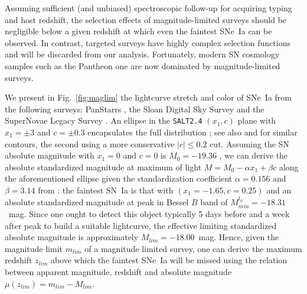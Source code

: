 \documentclass[]{aa} %
\begin{document}
Assuming sufficient (and unbiased) spectroscopic follow-up for acquiring typing
and host redshift, the selection effects of magnitude-limited surveys should be
negligible below a given redshift at which even the faintest SNe~Ia can be
observed. In contrast, targeted surveys have highly complex selection functions
and will be discarded from our analysis. Fortunately, modern SN cosmology
samples such as the Pantheon one are now dominated by magnitude-limited surveys.

We present in Fig.~\ref{fig:maglim} the lightcurve stretch and color of SNe~Ia
from the following surveys: PanStarrs \citep[PS1][]{rest2014}, the Sloan Digital
Sky Survey \citep[SDSS][]{frieman2008} and the SuperNovae Legacy Survey
\citep[SNLS][]{astier2006}. An ellipse in the \textsc{\texttt{SALT2.4}} $(x_1,
c)$ plane with $x_1 = \pm 3$ and $c = \pm 0.3$ encapsulates the full
distribution \citep{guy2007,betoule2014}; see also \citet{bazin2011} and
\citet{campbell2013} for similar contours, the second using a more conservative
$|c| \leq 0.2$ cut. Assuming the SN absolute magnitude with $x_1=0$ and $c=0$
is $M_0=-19.36$ \citep{kessler2009,scolnic2014}, we can derive the absolute
standardized magnitude at maximum of light $M = M_0 - \alpha x_1 + \beta c$
along the aforementioned ellipse given the standardization coefficient
$\alpha=0.156$ and $\beta=3.14$ from \cite{scolnic2018a}: the faintest SN~Ia is
that with $(x_1=-1.65, c=0.25)$ and an absolute standardized magnitude at peak
in Bessel $B$ band of $M^{t_0}_{min} = -18.31$~mag. Since one ought to detect
this object typically 5 days before and a week after peak to build a suitable
lightcurve, the effective limiting standardized absolute magnitude is
approximately $M_{lim} = -18.00$~mag. Hence, given the magnitude limit $m_{lim}$
of a magnitude limited survey, one can derive the maximum redshift $z_{lim}$
above which the faintest SNe~Ia will be missed using the relation between
apparent magnitude, redshift and absolute magnitude $\mu(z_{lim}) = m_{lim} -
M_{lim}$.
\end{document}
